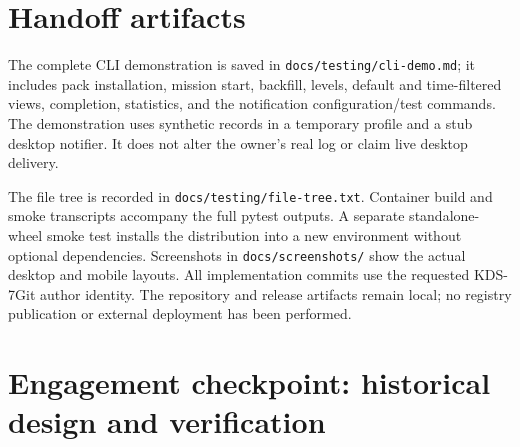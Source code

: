\documentclass[11pt,a4paper]{article}
\begin{document}
\section{Handoff artifacts}
The complete CLI demonstration is saved in
\texttt{docs/testing/cli-demo.md}; it includes pack installation, mission start,
backfill, levels, default and time-filtered views, completion, statistics, and
the notification configuration/test commands. The demonstration uses synthetic
records in a temporary profile and a stub desktop notifier. It does not alter
the owner's real log or claim live desktop delivery.

The file tree is recorded in \texttt{docs/testing/file-tree.txt}. Container
build and smoke transcripts accompany the full pytest outputs. A separate
standalone-wheel smoke test installs the distribution into a new environment
without optional dependencies. Screenshots in \texttt{docs/screenshots/} show
the actual desktop and mobile layouts. All implementation commits use the
requested KDS-7Git author identity. The repository and release artifacts remain
local; no registry publication or external deployment has been performed.
\clearpage
\appendix












\section{Engagement checkpoint: historical design and verification}







\end{document}
